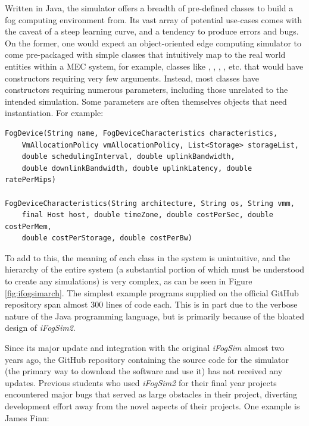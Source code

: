 \documentclass[]{UCD_CS_Interim_Report}
\begin{document}
Written in Java, the simulator offers a breadth of pre-defined classes to build a fog computing environment from. Its vast array of potential use-cases comes with the caveat of a steep learning curve, and a tendency to produce errors and bugs. On the former, one would expect an object-oriented edge computing simulator to come pre-packaged with simple classes that intuitively map to the real world entities within a MEC system, for example, classes like , , , , etc. that would have constructors requiring very few arguments. Instead, most classes have constructors requiring numerous parameters, including those unrelated to the intended simulation. Some parameters are often themselves objects that need instantiation. For example:
\vspace{-0.75em}
\begin{verbatim}
FogDevice(String name, FogDeviceCharacteristics characteristics,
    VmAllocationPolicy vmAllocationPolicy, List<Storage> storageList, 
    double schedulingInterval, double uplinkBandwidth, 
    double downlinkBandwidth, double uplinkLatency, double ratePerMips)

FogDeviceCharacteristics(String architecture, String os, String vmm,
    final Host host, double timeZone, double costPerSec, double costPerMem,
    double costPerStorage, double costPerBw)
\end{verbatim}

To add to this, the meaning of each class in the system is unintuitive, and the hierarchy of the entire system (a substantial portion of which must be understood to create any simulations) is very complex, as can be seen in Figure \ref{fig:ifogsimarch}. The simplest example programs supplied on the official GitHub repository span almost 300 lines of code each. This is in part due to the verbose nature of the Java programming language, but is primarily because of the bloated design of \textit{iFogSim2}.

Since its major update and integration with the original \textit{iFogSim} almost two years ago, the GitHub repository containing the source code for the simulator (the primary way to download the software and use it) has not received any updates. Previous students who used \textit{iFogSim2} for their final year projects encountered major bugs that served as large obstacles in their project, diverting development effort away from the novel aspects of their projects. One example is James Finn:
\end{document}
